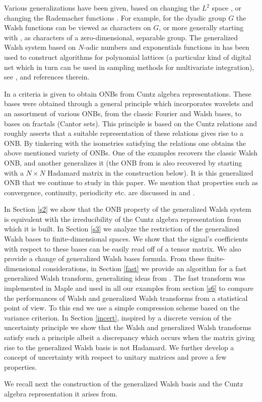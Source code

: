 \documentclass[11pt]{amsart}
\theoremstyle{definition}
\theoremstyle{remark}
\numberwithin{equation}{section}
\begin{document}
Various generalizations have been given, based on changing the $L^2$ space \cite{Vil}, or changing the Rademacher functions \cite{Chr}. For example, for the dyadic group $G$ the Walsh functions can be viewed as characters on $G$, or more generally starting with \cite{Vil}, as characters of a zero-dimensional, separable group. The  generalized Walsh system based on $N$-adic numbers and exponentials functions in \cite{Chr} has been used to construct algorithms for polynomial lattices (a particular kind of digital net which in turn can be used in sampling methods for multivariate integration), see \cite{Dik1}, \cite{Dik2} and references therein.
\par In \cite{DPS14} a criteria is given to obtain ONBs from Cuntz algebra representations. These bases were obtained through a general principle which incorporates wavelets and an assortment of various ONBs, from the classic Fourier and Walsh bases, to bases on fractals (Cantor sets). This principle is based on the Cuntz relations and roughly asserts that a suitable representation of these relations gives rise to a ONB. By tinkering with the isometries satisfying the relations one obtains the above mentioned variety of ONBs. One of the examples recovers the classic Walsh ONB, and another generalizes it (the ONB from \cite{Chr} is also recovered by starting with a $N\times N$ Hadamard matrix in the construction below). It is this generalized ONB that we continue to study in this paper. We mention that properties such as convergence, continuity, periodicity etc. are discussed in \cite{DuPi} and \cite{NHa}. 
\par  In Section \ref{s2} we show that the ONB property of the generalized Walsh system is equivalent with the irreducibility of the  Cuntz algebra representation from which it is built. In Section \ref{s3} we analyze the restriction of the generalized Walsh bases to finite-dimensional spaces. We show that the signal's coefficients with respect to these  bases can be easily read off of a tensor matrix. We also provide a change of generalized Walsh bases formula. From these finite-dimensional considerations, in Section \ref{fast} we provide an algorithm for a fast generalized Walsh transform, generalizing ideas from \cite{LeKa86}. The fast transform was implemented in Maple and used  in all our examples from section \ref{s6} to compare the performances of Walsh and generalized Walsh transforms from a statistical point of view. To this end we use a simple compression scheme based on the variance criterion. In Section \ref{incert}, inspired by a discrete version of the uncertainty principle \cite{DoSt} we  show that the Walsh and generalized Walsh transforms satisfy such a principle albeit a  discrepancy which occurs when the matrix giving rise to the generalized Walsh basis is not Hadamard. We further develop a concept of uncertainty with respect to unitary matrices and prove a few properties. 
\par We recall next the construction of the generalized Walsh basis and the Cuntz algebra representation it arises from. 
\end{document}
